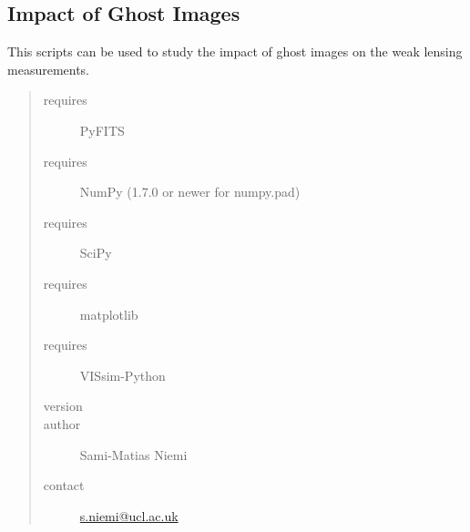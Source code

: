 \documentclass[a4paper,11pt,english]{sphinxmanual}
\begin{document}
\subsection{Impact of Ghost Images}
\label{reduction:impact-of-ghost-images}
This scripts can be used to study the impact of ghost images on the weak lensing measurements.
\begin{quote}\begin{description}
\item[{requires}] \leavevmode
PyFITS

\item[{requires}] \leavevmode
NumPy (1.7.0 or newer for numpy.pad)

\item[{requires}] \leavevmode
SciPy

\item[{requires}] \leavevmode
matplotlib

\item[{requires}] \leavevmode
VISsim-Python

\item[{version}] 

\item[{author}] \leavevmode
Sami-Matias Niemi

\item[{contact}] \leavevmode
\href{mailto:s.niemi@ucl.ac.uk}{s.niemi@ucl.ac.uk}

\end{description}\end{quote}
\end{document}
